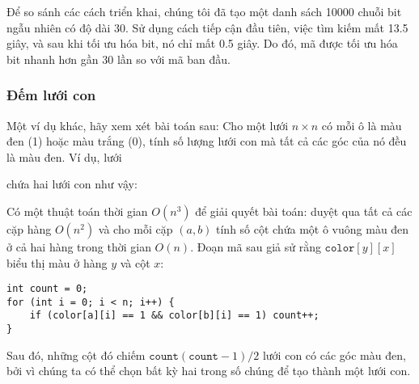 Để so sánh các cách triển khai, chúng tôi đã tạo
một danh sách 10000 chuỗi bit ngẫu nhiên có độ dài 30.
Sử dụng cách tiếp cận đầu tiên, việc tìm kiếm mất
13.5 giây, và sau khi tối ưu hóa bit,
nó chỉ mất 0.5 giây.
Do đó, mã được tối ưu hóa bit nhanh hơn gần
30 lần so với mã ban đầu.

\subsubsection{Đếm lưới con}

Một ví dụ khác, hãy xem xét
bài toán sau:
Cho một lưới $n \times n$ có
mỗi ô là màu đen (1) hoặc màu trắng (0),
tính số lượng lưới con
mà tất cả các góc của nó đều là màu đen.
Ví dụ, lưới
\begin{center}
\end{center}
chứa hai lưới con như vậy:
\begin{center}
\end{center}

Có một thuật toán thời gian $O(n^3)$ để giải quyết bài toán:
duyệt qua tất cả các cặp hàng $O(n^2)$ và cho mỗi cặp
$(a,b)$ tính số cột chứa
một ô vuông màu đen ở cả hai hàng trong thời gian $O(n)$.
Đoạn mã sau giả sử rằng $\texttt{color}[y][x]$
biểu thị màu ở hàng $y$ và cột $x$:
\begin{lstlisting}
int count = 0;
for (int i = 0; i < n; i++) {
    if (color[a][i] == 1 && color[b][i] == 1) count++;
}
\end{lstlisting}
Sau đó, những cột đó
chiếm $\texttt{count}(\texttt{count}-1)/2$ lưới con có các góc màu đen,
bởi vì chúng ta có thể chọn bất kỳ hai trong số chúng để tạo thành một lưới con.

